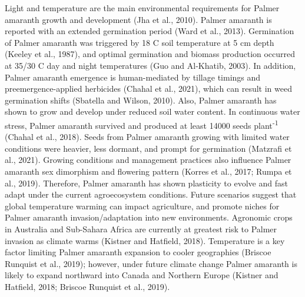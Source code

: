 \documentclass[utf8]{frontiersSCNS}
\begin{document}
Light and temperature are the main environmental requirements for Palmer
amaranth growth and development (Jha et al., 2010). Palmer amaranth is
reported with an extended germination period (Ward et al., 2013).
Germination of Palmer amaranth was triggered by 18 C soil temperature at
5 cm depth (Keeley et al., 1987), and optimal germination and biomass
production occurred at 35/30 C day and night temperatures (Guo and
Al-Khatib, 2003). In addition, Palmer amaranth emergence is
human-mediated by tillage timings and preemergence-applied herbicides
(Chahal et al., 2021), which can result in weed germination shifts
(Sbatella and Wilson, 2010). Also, Palmer amaranth has shown to grow and
develop under reduced soil water content. In continuous water stress,
Palmer amaranth survived and produced at least 14000 seeds
plant\textsuperscript{-1} (Chahal et al., 2018). Seeds from Palmer
amaranth growing with limited water conditions were heavier, less
dormant, and prompt for germination (Matzrafi et al., 2021). Growing
conditions and management practices also influence Palmer amaranth sex
dimorphism and flowering pattern (Korres et al., 2017; Rumpa et al.,
2019). Therefore, Palmer amaranth has shown plasticity to evolve and
fast adapt under the current agroecosystem conditions. Future scenarios
suggest that global temperature warming can impact agriculture, and
promote niches for Palmer amaranth invasion/adaptation into new
environments. Agronomic crops in Australia and Sub-Sahara Africa are
currently at greatest risk to Palmer invasion as climate warms (Kistner
and Hatfield, 2018). Temperature is a key factor limiting Palmer
amaranth expansion to cooler geographies (Briscoe Runquist et al.,
2019); however, under future climate change Palmer amaranth is likely to
expand northward into Canada and Northern Europe (Kistner and Hatfield,
2018; Briscoe Runquist et al., 2019).
\end{document}
